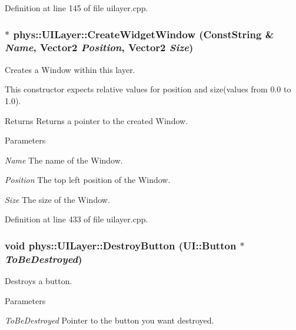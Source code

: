 Definition at line 145 of file uilayer.cpp.

\hypertarget{classphys_1_1UILayer_aaf8ca5a901a7300c63311be66309c6d7}{
\subsubsection[{CreateWidgetWindow}]{ $\ast$ phys::UILayer::CreateWidgetWindow ({\bf ConstString} \& {\em Name}, \/  {\bf Vector2} {\em Position}, \/  {\bf Vector2} {\em Size})}}
\label{da/d48/classphys_1_1UILayer_aaf8ca5a901a7300c63311be66309c6d7}


Creates a Window within this layer. 

This constructor expects relative values for position and size(values from 0.0 to 1.0). \begin{DoxyReturn}{Returns}
Returns a pointer to the created Window. 
\end{DoxyReturn}

\begin{DoxyParams}{Parameters}
\item[{\em Name}]The name of the Window. \item[{\em Position}]The top left position of the Window. \item[{\em Size}]The size of the Window. \end{DoxyParams}


Definition at line 433 of file uilayer.cpp.

\hypertarget{classphys_1_1UILayer_a8bb2f42fed52d5776d16911ffc4435ee}{
\subsubsection[{DestroyButton}]{\setlength{\rightskip}{0pt plus 5cm}void phys::UILayer::DestroyButton ({\bf UI::Button} $\ast$ {\em ToBeDestroyed})}}
\label{da/d48/classphys_1_1UILayer_a8bb2f42fed52d5776d16911ffc4435ee}


Destroys a button. 


\begin{DoxyParams}{Parameters}
\item[{\em ToBeDestroyed}]Pointer to the button you want destroyed. \end{DoxyParams}


